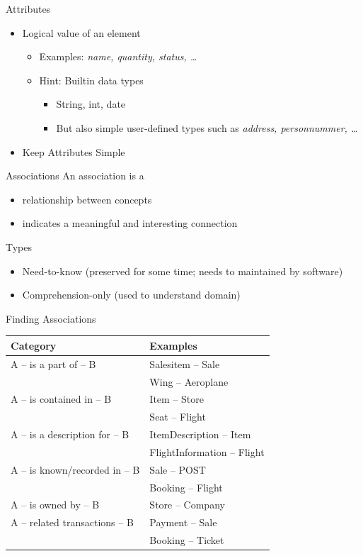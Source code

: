 \documentclass[10pt,t,a4paper]{beamer}
\begin{document}
\begin{frame}[label=sec-1-4]{Attributes}
\begin{itemize}
\item Logical value of an element
\begin{itemize}
\item Examples: \emph{name, quantity, status, \ldots{}}
\item Hint: Builtin data types
\begin{itemize}
\item String, int, date
\item But also simple user-defined types such as \emph{address, personnummer, \ldots{}}
\end{itemize}
\end{itemize}
\item \alert{Keep Attributes Simple}
\end{itemize}
\end{frame}
\begin{frame}[label=sec-1-5]{Associations}
An association is a
\begin{itemize}
\item relationship between concepts
\item indicates a meaningful and interesting connection
\end{itemize}

Types
\begin{itemize}
\item Need-to-know (preserved for some time; needs to maintained by software)
\item Comprehension-only (used to understand domain)
\end{itemize}
\end{frame}
\begin{frame}[label=sec-1-6]{Finding Associations}
\begin{center}
\begin{tabular}{ll}
Category & Examples\\
\hline
A -- is a part of -- B & Salesitem -- Sale\\
 & Wing -- Aeroplane\\
A -- is contained in -- B & Item -- Store\\
 & Seat -- Flight\\
A -- is a description for -- B & ItemDescription -- Item\\
 & FlightInformation -- Flight\\
A -- is known/recorded in -- B & Sale -- POST\\
 & Booking -- Flight\\
A -- is owned by -- B & Store -- Company\\
A -- related transactions -- B & Payment -- Sale\\
 & Booking -- Ticket\\
\hline
\end{tabular}
\end{center}
\end{frame}
\end{document}
